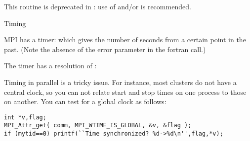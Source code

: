 This routine is deprecated in : use of
 and/or  is recommended.


 {Timing}
\label{sec:ref:mpi-timing}

MPI has a  timer: 
%
%
which gives the number of seconds from a certain point in the past.
(Note the absence of the error parameter in the fortran call.)

The timer has a resolution of :
%

Timing in parallel is a tricky issue. For instance, most clusters do
not have a central clock, so you can not relate start and stop times
on one process to those on another. You can test for a global clock as
follows:
\begin{lstlisting}
int *v,flag;
MPI_Attr_get( comm, MPI_WTIME_IS_GLOBAL, &v, &flag );
if (mytid==0) printf(``Time synchronized? %d->%d\n'',flag,*v);
\end{lstlisting}


